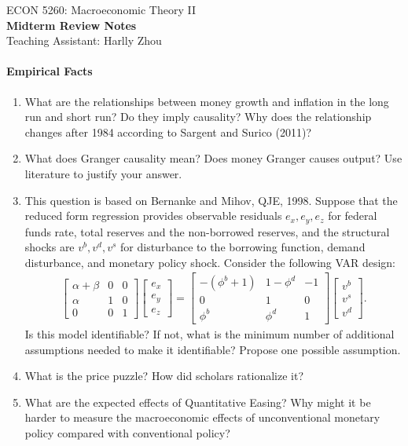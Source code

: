\documentclass[12pt]{article}
\begin{document}
\begin{center}
    ECON 5260: Macroeconomic Theory II\\
    {\large \textbf{Midterm Review Notes}}\\
    Teaching Assistant: Harlly Zhou
\end{center}

\paragraph{Empirical Facts}
\begin{enumerate}[label=\arabic*.]
    \item What are the relationships between money growth and inflation in the long run and short run? Do they imply causality? Why does the relationship changes after 1984 according to Sargent and Surico (2011)?
    \item What does Granger causality mean? Does money Granger causes output? Use literature to justify your answer.
    \item This question is based on Bernanke and Mihov, QJE, 1998. Suppose that the reduced form regression provides observable residuals $e_x, e_y, e_z$ for federal funds rate, total reserves and the non-borrowed reserves, and the structural shocks are $v^b, v^d, v^s$ for disturbance to the borrowing function, demand disturbance, and monetary policy shock. Consider the following VAR design:
    \begin{align*}
        \begin{bmatrix}
            \alpha + \beta & 0 & 0 \\
            \alpha & 1 & 0 \\
            0 & 0 & 1
        \end{bmatrix}
        \begin{bmatrix}
            e_x \\
            e_y \\
            e_z
        \end{bmatrix}
        =
        \begin{bmatrix}
            -(\phi^b+1) & 1-\phi^d & -1 \\
            0 & 1 & 0 \\
            \phi^b & \phi^d & 1
        \end{bmatrix}
        \begin{bmatrix}
            v^b \\
            v^s \\
            v^d
        \end{bmatrix}.
    \end{align*}
    Is this model identifiable? If not, what is the minimum number of additional assumptions needed to make it identifiable? Propose one possible assumption.
    \item What is the price puzzle? How did scholars rationalize it?
    \item What are the expected effects of Quantitative Easing? Why might it be harder to measure the macroeconomic effects of unconventional monetary policy compared with conventional policy?
\end{enumerate}
\end{document}
